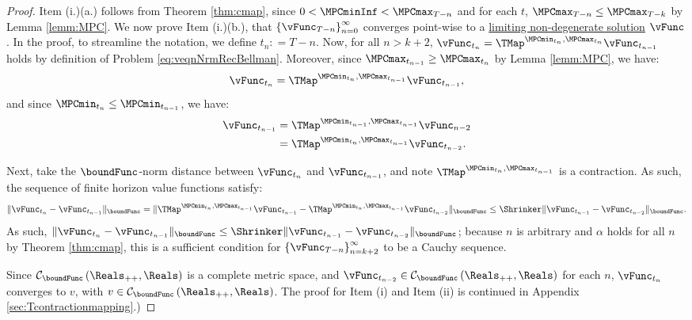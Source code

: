 \documentclass[BufferStockTheory]{subfiles}
\begin{document}
\begin{proof}

Item (i.)(a.) follows from Theorem \ref{thm:cmap}, since $0<\MPCminInf<\MPCmax_{T-n}$ and for each $t$, $\MPCmax_{T-n}\leq \MPCmax_{T-k}$ by Lemma \ref{lemm:MPC}.
We now prove Item (i.)(b.), that $\left\{\vFunc_{T-n}\right\}_{n=0}^{\infty}$ converges point-wise to a \hyperlink{Definition-of-a-non-degenerate-Solution}{limiting non-degenerate solution} $\vFunc$.
In the proof, to streamline the notation, we define $t_{n}\colon = T - n$. Now, for all $n>k+2$, $\vFunc_{t_{n}} = \TMap^{\MPCmin_{t_{n}}, \MPCmax_{t_{n}}}\vFunc_{t_{n-1}}$ holds by definition of Problem \eqref{eq:veqnNrmRecBellman}.
Moreover, since $\MPCmax_{t_{n-1}}\geq \MPCmax_{t_{n}}$ by Lemma \ref{lemm:MPC}, we have:
%
\begin{equation*}
\vFunc_{t_{n}} = \TMap^{\MPCmin_{t_{n}}, \MPCmax_{t_{n-1}}}\vFunc_{t_{n-1}}, 
\end{equation*}
%
and since $\MPCmin_{t_{n}}\leq \MPCmin_{t_{n-1}}$, we have:
%
\begin{align*}
\vFunc_{t_{n-1}} &  = \TMap^{\MPCmin_{t_{n-1}}, \MPCmax_{t_{n-1}}}\vFunc_{n-2}\\ &  = \TMap^{\MPCmin_{t_{n}}, \MPCmax_{t_{n-1}}}\vFunc_{t_{n-2}}. 
\end{align*}

Next, take the $\boundFunc$-norm distance between $\vFunc_{t_{n}}$ and $\vFunc_{t_{n-1}}$, and note  $\TMap^{\MPCmin_{t_{n}}, \MPCmax_{t_{n-1}}}$ is a contraction. As such, the sequence of finite horizon value functions satisfy:
%
\begin{equation*}
\Vert\vFunc_{t_{n}} - \vFunc_{t_{n-1}}\Vert_{\boundFunc} = \Vert\TMap^{\MPCmin_{t_{n}}, \MPCmax_{t_{n-1}}}\vFunc_{t_{n-1}} - \TMap^{\MPCmin_{t_{n}}, \MPCmax_{t_{n-1}}}\vFunc_{t_{n-2}}\Vert_{\boundFunc} \leq \Shrinker \Vert \vFunc_{t_{n-1}} - \vFunc_{t_{n-2}}\Vert_{\boundFunc}. 
\end{equation*}
%
As such, $\Vert \vFunc_{t_{n}} - \vFunc_{t_{n-1}}\Vert_{\boundFunc } \leq \Shrinker \Vert \vFunc_{t_{n-1}} - \vFunc_{t_{n-2}}\Vert_{\boundFunc } $; because $n$ is arbitrary and $\alpha$ holds for all $n$ by Theorem \ref{thm:cmap}, this is a sufficient condition for  $\left\{\vFunc_{T-n}\right\}_{n=k+2}^{\infty}$ to be a Cauchy sequence.

Since $\mathcal{C}_{\boundFunc }\left(\Reals_{++},\Reals\right) $ is a complete metric space, and $\vFunc_{t_{n-2}} \in \mathcal{C}_{\boundFunc }\left(\Reals_{++},\Reals\right)$ for each $n$, $\vFunc_{t_{n}}$ converges to $v$, with $v\in \mathcal{C}_{\boundFunc }\left(\Reals_{++},\Reals\right)$.
The proof for Item (i) and Item (ii) is continued in Appendix \ref{sec:Tcontractionmapping}.)
\end{proof}
\end{document}

